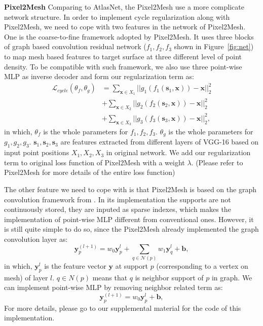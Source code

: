 \noindent\textbf{Pixel2Mesh}
Comparing to AtlasNet, the Pixel2Mesh\cite{pixel2mesh} use a more complicate network structure. In order to implement cycle regularization along with Pixel2Mesh, we need to cope with two features in the network of Pixel2Mesh. 
One is the coarse-to-fine framework adopted by Pixel2Mesh. It uses three blocks of graph based convolution residual network ($f_1,f_2,f_3$ shown in Figure~\ref{fig:net}) to map mesh based features to target surface at three different level of point density. To be compatible with such framework, we also use three point-wise MLP as inverse decoder and form our regularization term as:
\begin{equation}
\begin{aligned}
\mathcal{L}_{cycle}(\theta_f,\theta_g) &= \sum_{\mathbf{x} \in X_1}||g_{1}(f_{1}(\mathbf{s}_1,\mathbf{x})) - \mathbf{x}||_2^2\\
&+ \sum_{\mathbf{x} \in X_2}||g_{2}(f_{2}(\mathbf{s}_2,\mathbf{x})) - \mathbf{x}||_2^2\\
&+ \sum_{\mathbf{x} \in X_3}||g_{3}(f_{3}(\mathbf{s}_3,\mathbf{x})) - \mathbf{x}||_2^2,
\end{aligned}
\end{equation}
in which, $\theta_f$ is the whole parameters for $f_1,f_2,f_3$. $\theta_g$ is the whole parameters for $g_1,g_2,g_3$. $\mathbf{s}_1,\mathbf{s}_2,\mathbf{s}_3$ are features extracted from different layers of VGG-16 based on input point positions $X_1,X_2,X_3$ in original network. We add our regularization term to original loss function of Pixel2Mesh with a weight $\lambda$. (Please refer to Pixel2Mesh\cite{pixel2mesh} for more details of the entire loss function)

The other feature we need to cope with is that Pixel2Mesh is based on the graph convolution framework from \cite{graphconv}. In its implementation the supports are not continuously stored, they are inputed as sparse indexes, which makes the implementation of point-wise MLP different from conventional ones. However, it is still quite simple to do so, since the Pixel2Mesh already implemented the graph convolution layer as:
\begin{equation}
\mathbf{y}_p^{(l+1)} = w_0 \mathbf{y}_p^l + \sum_{q\in\mathcal{N}(p)} w_1\mathbf{y}_q^l + \mathbf{b},
\end{equation}
in which,  $\mathbf{y}_p^l$ is the feature vector $\mathbf{y}$ at support $p$ (corresponding to a vertex on mesh) of layer $l$. $q\in N(p)$ means that $q$ is neighbor support of $p$ in graph. We can implement point-wise MLP by removing neighbor related term as:
\begin{equation}
\mathbf{y}_p^{(l+1)} = w_0 \mathbf{y}_p^l + \mathbf{b},
\end{equation}
For more details, please go to our supplemental material for the code of this implementation.